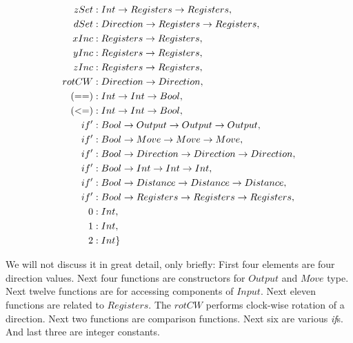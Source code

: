 \documentclass[12pt,a4paper]{report}
\begin{document}
\begin{align*}
zSet             &: Int \rightarrow Registers \rightarrow Registers                 ,\\          
dSet             &: Direction \rightarrow Registers \rightarrow Registers           ,\\                
xInc             &: Registers \rightarrow Registers                         ,\\              
yInc             &: Registers \rightarrow Registers                         ,\\              
zInc             &: Registers \rightarrow Registers                         ,\\              
rotCW            &: Direction \rightarrow Direction                         ,\\                                                             
(==)             &: Int \rightarrow Int \rightarrow Bool                            ,\\                                      
(<=)             &: Int \rightarrow Int \rightarrow Bool                            ,\\               
if'              &: Bool \rightarrow Output \rightarrow Output \rightarrow Output           ,\\                                  
if'              &: Bool \rightarrow Move \rightarrow Move \rightarrow Move                 ,\\                                  
if'              &: Bool \rightarrow Direction \rightarrow Direction \rightarrow Direction  ,\\              
if'              &: Bool \rightarrow Int \rightarrow Int \rightarrow Int                    ,\\     
if'              &: Bool \rightarrow Distance \rightarrow Distance \rightarrow Distance     ,\\        
if'              &: Bool \rightarrow Registers \rightarrow Registers \rightarrow Registers  ,\\                           
0                &: Int                                             ,\\                                     
1                &: Int                                             ,\\                                    
2                &: Int                                             \}\\
\end{align*}

\newpage
We will not discuss it in great detail, only briefly: First four 
elements are four direction values. Next four functions are
constructors for $Output$ and $Move$ type. Next twelve functions
are for accessing components of $Input$. Next eleven functions are 
related to $Registers$. The $rotCW$ performs clock-wise rotation of a direction.
Next two functions are comparison functions. Next six are various \textit{if}s. And last 
three are integer constants. 
\end{document}
